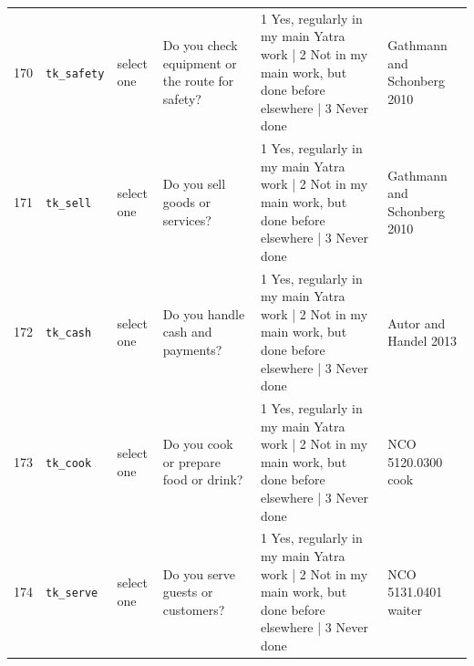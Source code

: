 \documentclass[9pt,a4paper,landscape]{article}
\begin{document}
\begin{longtable}{@{}p{0.5cm}p{3.3cm}p{1.7cm}p{7.3cm}p{5.6cm}p{5.4cm}@{}}
\footnotesize 170 & \footnotesize\texttt{tk\_safety} & \scriptsize select one & \footnotesize Do you check equipment or the route for safety? \par\vspace{1pt}{\footnotesize\color{hdr}{\hifont क्या आप सामान या रास्ते की सुरक्षा जाँचना का काम करते हैं? (1 अपने मुख्य यात्रा-काम में नियमित; 2 मुख्य काम में नहीं, पर पहले कहीं और किया है; 3 कभी नहीं)}} & \scriptsize 1 Yes, regularly in my main Yatra work | 2 Not in my main work, but done before elsewhere | 3 Never done & \scriptsize Gathmann and Schonberg 2010\\
\footnotesize 171 & \footnotesize\texttt{tk\_sell} & \scriptsize select one & \footnotesize Do you sell goods or services? \par\vspace{1pt}{\footnotesize\color{hdr}{\hifont क्या आप सामान या सेवा बेचना का काम करते हैं? (1 अपने मुख्य यात्रा-काम में नियमित; 2 मुख्य काम में नहीं, पर पहले कहीं और किया है; 3 कभी नहीं)}} & \scriptsize 1 Yes, regularly in my main Yatra work | 2 Not in my main work, but done before elsewhere | 3 Never done & \scriptsize Gathmann and Schonberg 2010\\
\footnotesize 172 & \footnotesize\texttt{tk\_cash} & \scriptsize select one & \footnotesize Do you handle cash and payments? \par\vspace{1pt}{\footnotesize\color{hdr}{\hifont क्या आप पैसे और भुगतान सँभालना का काम करते हैं? (1 अपने मुख्य यात्रा-काम में नियमित; 2 मुख्य काम में नहीं, पर पहले कहीं और किया है; 3 कभी नहीं)}} & \scriptsize 1 Yes, regularly in my main Yatra work | 2 Not in my main work, but done before elsewhere | 3 Never done & \scriptsize Autor and Handel 2013\\
\footnotesize 173 & \footnotesize\texttt{tk\_cook} & \scriptsize select one & \footnotesize Do you cook or prepare food or drink? \par\vspace{1pt}{\footnotesize\color{hdr}{\hifont क्या आप खाना या पीने की चीज़ बनाना का काम करते हैं? (1 अपने मुख्य यात्रा-काम में नियमित; 2 मुख्य काम में नहीं, पर पहले कहीं और किया है; 3 कभी नहीं)}} & \scriptsize 1 Yes, regularly in my main Yatra work | 2 Not in my main work, but done before elsewhere | 3 Never done & \scriptsize NCO 5120.0300 cook\\
\footnotesize 174 & \footnotesize\texttt{tk\_serve} & \scriptsize select one & \footnotesize Do you serve guests or customers? \par\vspace{1pt}{\footnotesize\color{hdr}{\hifont क्या आप मेहमानों या ग्राहकों की सेवा करना का काम करते हैं? (1 अपने मुख्य यात्रा-काम में नियमित; 2 मुख्य काम में नहीं, पर पहले कहीं और किया है; 3 कभी नहीं)}} & \scriptsize 1 Yes, regularly in my main Yatra work | 2 Not in my main work, but done before elsewhere | 3 Never done & \scriptsize NCO 5131.0401 waiter\\

\end{longtable}
\end{document}
